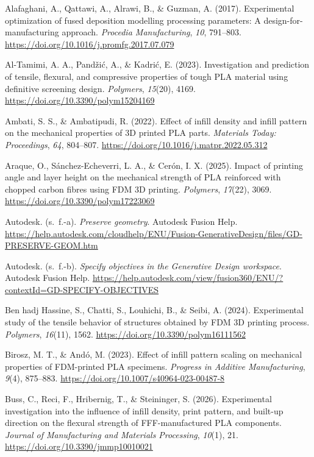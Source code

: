 Alafaghani, A., Qattawi, A., Alrawi, B., \& Guzman, A. (2017). Experimental optimization of fused deposition modelling processing parameters: A design-for-manufacturing approach. \textit{Procedia Manufacturing}, \textit{10}, 791–803. \url{https://doi.org/10.1016/j.promfg.2017.07.079}\par
Al-Tamimi, A. A., Pandžić, A., \& Kadrić, E. (2023). Investigation and prediction of tensile, flexural, and compressive properties of tough PLA material using definitive screening design. \textit{Polymers}, \textit{15}(20), 4169. \url{https://doi.org/10.3390/polym15204169}\par
Ambati, S. S., \& Ambatipudi, R. (2022). Effect of infill density and infill pattern on the mechanical properties of 3D printed PLA parts. \textit{Materials Today: Proceedings}, \textit{64}, 804–807. \url{https://doi.org/10.1016/j.matpr.2022.05.312}\par
Araque, O., Sánchez-Echeverri, L. A., \& Cerón, I. X. (2025). Impact of printing angle and layer height on the mechanical strength of PLA reinforced with chopped carbon fibres using FDM 3D printing. \textit{Polymers}, \textit{17}(22), 3069. \url{https://doi.org/10.3390/polym17223069}\par
Autodesk. (s.~f.-a). \textit{Preserve geometry}. Autodesk Fusion Help. \url{https://help.autodesk.com/cloudhelp/ENU/Fusion-GenerativeDesign/files/GD-PRESERVE-GEOM.htm}\par
Autodesk. (s.~f.-b). \textit{Specify objectives in the Generative Design workspace}. Autodesk Fusion Help. \url{https://help.autodesk.com/view/fusion360/ENU/?contextId=GD-SPECIFY-OBJECTIVES}\par
Ben hadj Hassine, S., Chatti, S., Louhichi, B., \& Seibi, A. (2024). Experimental study of the tensile behavior of structures obtained by FDM 3D printing process. \textit{Polymers}, \textit{16}(11), 1562. \url{https://doi.org/10.3390/polym16111562}\par
Birosz, M. T., \& Andó, M. (2023). Effect of infill pattern scaling on mechanical properties of FDM-printed PLA specimens. \textit{Progress in Additive Manufacturing}, \textit{9}(4), 875–883. \url{https://doi.org/10.1007/s40964-023-00487-8}\par
Buss, C., Reci, F., Hribernig, T., \& Steininger, S. (2026). Experimental investigation into the influence of infill density, print pattern, and built-up direction on the flexural strength of FFF-manufactured PLA components. \textit{Journal of Manufacturing and Materials Processing}, \textit{10}(1), 21. \url{https://doi.org/10.3390/jmmp10010021}\par
